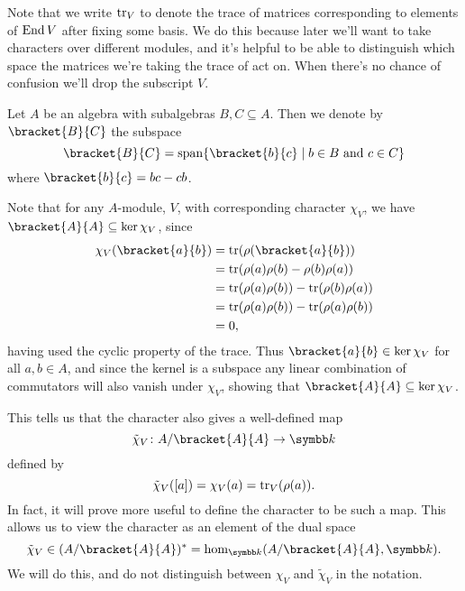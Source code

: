 Note that we write \(\operatorname{tr}_V\) to denote the trace of matrices corresponding to elements of \(\operatorname{End} V\) after fixing some basis.
We do this because later we'll want to take characters over different modules, and it's helpful to be able to distinguish which space the matrices we're taking the trace of act on.
When there's no chance of confusion we'll drop the subscript \(V\).

\begin{dfn}{}{}
    Let \(A\) be an algebra with subalgebras \(B, C \subseteq A\).
    Then we denote by \(\bracket{B}{C}\) the subspace
    \begin{equation}
        \bracket{B}{C} = \Span \{\bracket{b}{c} \mid b \in B \text{ and } c \in C\}
    \end{equation}
    where \(\bracket{b}{c} = bc - cb\).
\end{dfn}

Note that for any \(A\)-module, \(V\), with corresponding character \(\chi_V\), we have \(\bracket{A}{A} \subseteq \ker \chi_V\), since
\begin{align}
    \chi_V(\bracket{a}{b}) &= \tr(\rho(\bracket{a}{b}))\\
    &= \tr(\rho(a)\rho(b) - \rho(b)\rho(a))\\
    &= \tr(\rho(a)\rho(b)) - \tr(\rho(b)\rho(a))\\
    &= \tr(\rho(a)\rho(b)) - \tr(\rho(a)\rho(b))\\
    &= 0,
\end{align}
having used the cyclic property of the trace.
Thus \(\bracket{a}{b} \in \ker \chi_V\) for all \(a, b \in A\), and since the kernel is a subspace any linear combination of commutators will also vanish under \(\chi_V\), showing that \(\bracket{A}{A} \subseteq \ker \chi_V\).

This tells us that the character also gives a well-defined map
\begin{equation}
    \tilde{\chi}_V \colon A / \bracket{A}{A} \to \field
\end{equation}
defined by
\begin{equation}
    \tilde{\chi}_V([a]) = \chi_V(a) = \operatorname{tr}_V(\rho(a)).
\end{equation}
In fact, it will prove more useful to define the character to be such a map.
This allows us to view the character as an element of the dual space
\begin{equation}
    \tilde{\chi}_V \in (A/\bracket{A}{A})^* = \hom_{\field}(A/\bracket{A}{A}, \field).
\end{equation}
We will do this, and do not distinguish between \(\chi_V\) and \(\tilde{\chi}_V\) in the notation.

